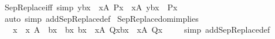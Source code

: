 \begin{isabellebody}
%
\isadelimproof
\isanewline
%
\endisadelimproof
\isanewline
{}\isamarkupfalse%
\ SepReplace{\isacharunderscore}{\kern0pt}iff\ {\isacharbrackleft}{\kern0pt}simp{\isacharbrackright}{\kern0pt}{\isacharcolon}{\kern0pt}\ {\isachardoublequoteopen}y{\isasymin}{\isacharbraceleft}{\kern0pt}b{\isacharparenleft}{\kern0pt}x{\isacharparenright}{\kern0pt}\ {\isachardot}{\kern0pt}{\isachardot}{\kern0pt}\ x{\isasymin}A{\isacharcomma}{\kern0pt}\ P{\isacharparenleft}{\kern0pt}x{\isacharparenright}{\kern0pt}{\isacharbraceright}{\kern0pt}\ {\isasymlongleftrightarrow}\ {\isacharparenleft}{\kern0pt}{\isasymexists}x{\isasymin}A{\isachardot}{\kern0pt}\ y{\isacharequal}{\kern0pt}b{\isacharparenleft}{\kern0pt}x{\isacharparenright}{\kern0pt}\ {\isacharampersand}{\kern0pt}\ P{\isacharparenleft}{\kern0pt}x{\isacharparenright}{\kern0pt}{\isacharparenright}{\kern0pt}{\isachardoublequoteclose}\isanewline
%
\isadelimproof
\ \ %
\endisadelimproof
%
\isatagproof
{}\isamarkupfalse%
\ {\isacharparenleft}{\kern0pt}auto\ simp\ add{\isacharcolon}{\kern0pt}SepReplace{\isacharunderscore}{\kern0pt}def{\isacharparenright}{\kern0pt}%
\endisatagproof
{\isafoldproof}%
%
\isadelimproof
\isanewline
%
\endisadelimproof
\isanewline
{}\isamarkupfalse%
\ SepReplace{\isacharunderscore}{\kern0pt}dom{\isacharunderscore}{\kern0pt}implies\ {\isacharcolon}{\kern0pt}\isanewline
\ \ {\isachardoublequoteopen}{\isacharparenleft}{\kern0pt}{\isasymAnd}\ x\ {\isachardot}{\kern0pt}\ x\ {\isasymin}A\ {\isasymLongrightarrow}\ b{\isacharparenleft}{\kern0pt}x{\isacharparenright}{\kern0pt}\ {\isacharequal}{\kern0pt}\ b{\isacharprime}{\kern0pt}{\isacharparenleft}{\kern0pt}x{\isacharparenright}{\kern0pt}{\isacharparenright}{\kern0pt}{\isasymLongrightarrow}\ {\isacharbraceleft}{\kern0pt}b{\isacharparenleft}{\kern0pt}x{\isacharparenright}{\kern0pt}\ {\isachardot}{\kern0pt}{\isachardot}{\kern0pt}\ x{\isasymin}A{\isacharcomma}{\kern0pt}\ Q{\isacharparenleft}{\kern0pt}x{\isacharparenright}{\kern0pt}{\isacharbraceright}{\kern0pt}{\isacharequal}{\kern0pt}{\isacharbraceleft}{\kern0pt}b{\isacharprime}{\kern0pt}{\isacharparenleft}{\kern0pt}x{\isacharparenright}{\kern0pt}\ {\isachardot}{\kern0pt}{\isachardot}{\kern0pt}\ x{\isasymin}A{\isacharcomma}{\kern0pt}\ Q{\isacharparenleft}{\kern0pt}x{\isacharparenright}{\kern0pt}{\isacharbraceright}{\kern0pt}{\isachardoublequoteclose}\isanewline
%
\isadelimproof
\ \ %
\endisadelimproof
%
\isatagproof
{}\isamarkupfalse%
\ \ {\isacharparenleft}{\kern0pt}simp\ add{\isacharcolon}{\kern0pt}SepReplace{\isacharunderscore}{\kern0pt}def{\isacharparenright}{\kern0pt}%

\end{isabellebody}
